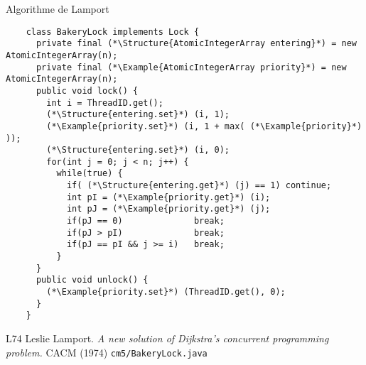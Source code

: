 
\begingroup

\begin{frame}[fragile]{Algorithme de Lamport}

  \begin{lstlisting}
    class BakeryLock implements Lock {
      private final (*\Structure{AtomicIntegerArray entering}*) = new AtomicIntegerArray(n);
      private final (*\Example{AtomicIntegerArray priority}*) = new AtomicIntegerArray(n);
      public void lock() {
        int i = ThreadID.get();
        (*\Structure{entering.set}*) (i, 1);
        (*\Example{priority.set}*) (i, 1 + max( (*\Example{priority}*) ));
        (*\Structure{entering.set}*) (i, 0);
        for(int j = 0; j < n; j++) {
          while(true) {
            if( (*\Structure{entering.get}*) (j) == 1) continue;
            int pI = (*\Example{priority.get}*) (i);
            int pJ = (*\Example{priority.get}*) (j);
            if(pJ == 0)              break;
            if(pJ > pI)              break;
            if(pJ == pI && j >= i)   break;
          }
      }
      public void unlock() {
        (*\Example{priority.set}*) (ThreadID.get(), 0);
      }
    }
  \end{lstlisting}

  \begin{citing}
  \item[L74] Leslie Lamport. \textit{A new solution of Dijkstra's concurrent programming problem.} CACM (1974)
    \jitem \lstinline{cm5/BakeryLock.java}
  \end{citing}

\end{frame}

\endgroup
\endinput
      private boolean isBockedBy(int i, int j) {
        if( (*\Structure{entering.get}*) (j) == 1 ) return true;
        int pI = (*\Example{priority.get}*) (i);  int pJ = (*\Example{priority.get}*) (j);
        return pJ != 0 && (pJ <  pI || (pJ == pI && j<i));
      }
